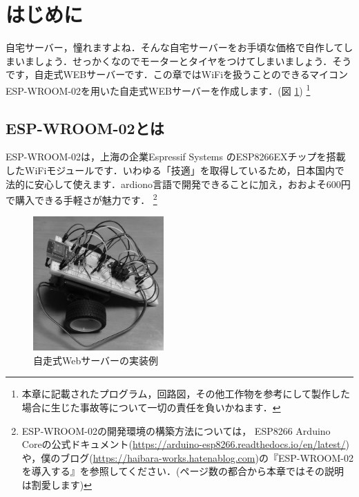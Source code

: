 \section{はじめに}
自宅サーバー，憧れますよね．そんな自宅サーバーをお手頃な価格で自作してしまいましょう．せっかくなのでモーターとタイヤをつけてしまいましょう．そうです，自走式WEBサーバーです．この章ではWiFiを扱うことのできるマイコン ESP-WROOM-02を用いた自走式WEBサーバーを作成します．(図 \ref{fig:webserver})
\footnote{本章に記載されたプログラム，回路図，その他工作物を参考にして製作した場合に生じた事故等について一切の責任を負いかねます．}
\subsection{ESP-WROOM-02とは}
ESP-WROOM-02は，上海の企業Espressif Systems のESP8266EXチップを搭載したWiFiモジュールです．いわゆる「技適」を取得しているため，日本国内で法的に安心して使えます．ardiono言語で開発できることに加え，おおよそ600円で購入できる手軽さが魅力です．
\footnote{ESP-WROOM-02の開発環境の構築方法については， ESP8266 Arduino Coreの公式ドキュメント(\url{https://arduino-esp8266.readthedocs.io/en/latest/})や，僕のブログ(\url{https://haibara-works.hatenablog.com})の『ESP-WROOM-02を導入する』を参照してください．(ページ数の都合から本章ではその説明は割愛します)}

\begin{figure}[htbp]
    \centering
    \includegraphics[width=50mm]{./assets/haibaraaaaaaaasset/webserver.jpg}
    \caption{自走式Webサーバーの実装例}
    \label{fig:webserver}
\end{figure}

